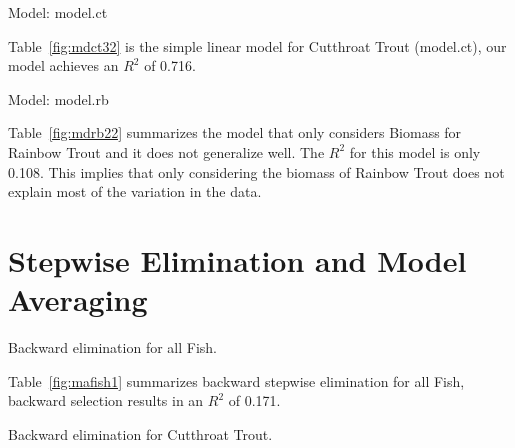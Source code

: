 \begin{table}
 \begin{singlespace*}

\caption{Model: model.ct}
\label{fig:mdct32}
\end{singlespace*}

\end{table}

Table~\ref{fig:mdct32} is the simple linear model for Cutthroat Trout (model.ct), our model achieves an $R^{2}$ of 0.716.



\begin{table}[H]
 \begin{singlespace*}

\caption{Model: model.rb}
\label{fig:mdrb22}
\end{singlespace*}
\end{table}

Table~\ref{fig:mdrb22} summarizes the model that only considers Biomass for Rainbow Trout and it does not generalize well. The $R^{2}$ for this model is only 0.108. This implies that only considering the biomass of Rainbow Trout does not explain most of the variation in the data.





\section{Stepwise Elimination and Model Averaging}


\begin{table}[H]
 \begin{singlespace*}

\caption{Backward elimination for all Fish.}
\label{fig:mafish1}
\end{singlespace*}
\end{table}



Table~\ref{fig:mafish1} summarizes backward stepwise elimination for all Fish, backward selection results in an $R^{2}$ of 0.171.



\begin{table}[H]
 \begin{singlespace*}

\caption{Backward elimination for Cutthroat Trout.}
\label{fig:mdct32}
\end{singlespace*}
\end{table}



